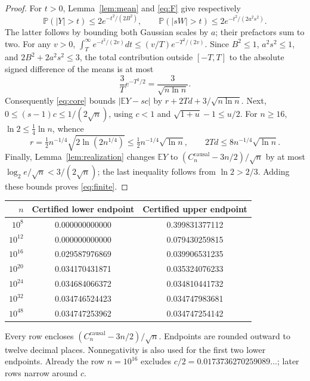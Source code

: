 \documentclass[11pt,a4paper]{article}
\newcommand{\E}{\mathbb E}
\newcommand{\Prob}{\mathbb P}
\newcommand{\causal}{\mathrm{causal}}
\begin{document}
\begin{proof}
For $t>0$, Lemma~\ref{lem:mean} and \eqref{eq:F} give respectively
\[
\Prob(|Y|>t)\le2e^{-t^2/(2B^2)},\qquad
\Prob(|sW|>t)\le2e^{-t^2/(2a^2s^2)}.
\]
The latter follows by bounding both Gaussian scales by $a$; their
prefactors sum to two. For any $v>0$,
$\int_T^\infty e^{-t^2/(2v)}dt\le(v/T)e^{-T^2/(2v)}$.
Since $B^2\le1$, $a^2s^2\le1$, and
$2B^2+2a^2s^2\le3$, the total contribution outside $[-T,T]$
to the absolute signed difference of the means is at most
\[
\frac3T e^{-T^2/2}=\frac{3}{\sqrt{n\ln n}}.
\]
Consequently \eqref{eq:core} bounds $|\E Y-sc|$ by
$r+2Td+3/\sqrt{n\ln n}$. Next,
$0\le(s-1)c\le1/(2\sqrt n)$, using $c<1$ and
$\sqrt{1+u}-1\le u/2$. For $n\ge16$,
$\ln2\le\tfrac14\ln n$, whence
\[
r=\tfrac12 n^{-1/4}\sqrt{2\ln(2n^{1/4})}
\le\tfrac12 n^{-1/4}\sqrt{\ln n},\qquad
2Td\le8n^{-1/4}\sqrt{\ln n}.
\]
Finally, Lemma~\ref{lem:realization} changes $\E Y$ to
$(C_n^{\causal}-3n/2)/\sqrt n$ by at most
$\log_2e/\sqrt n<3/(2\sqrt n)$; the last inequality follows from
$\ln2>2/3$. Adding these bounds proves \eqref{eq:finite}.
\end{proof}

\begin{center}
\begin{tabular}{@{}rcc@{}}
\toprule
$n$ & Certified lower endpoint & Certified upper endpoint\\
\midrule
$10^{8}$ & 0.000000000000 & 0.399831377112 \\
$10^{12}$ & 0.000000000000 & 0.079430259815 \\
$10^{16}$ & 0.029587976869 & 0.039906531235 \\
$10^{20}$ & 0.034170431871 & 0.035324076233 \\
$10^{24}$ & 0.034684066372 & 0.034810441732 \\
$10^{32}$ & 0.034746524423 & 0.034747983681 \\
$10^{48}$ & 0.034747253962 & 0.034747254142 \\
\bottomrule
\end{tabular}
\end{center}
Every row encloses $(C_n^{\causal}-3n/2)/\sqrt n$. Endpoints are rounded
outward to twelve decimal places. Nonnegativity is also used for the
first two lower endpoints. Already the row $n=10^{16}$ excludes
$c/2=0.0173736270259089\ldots$; later rows narrow around $c$.
\end{document}
